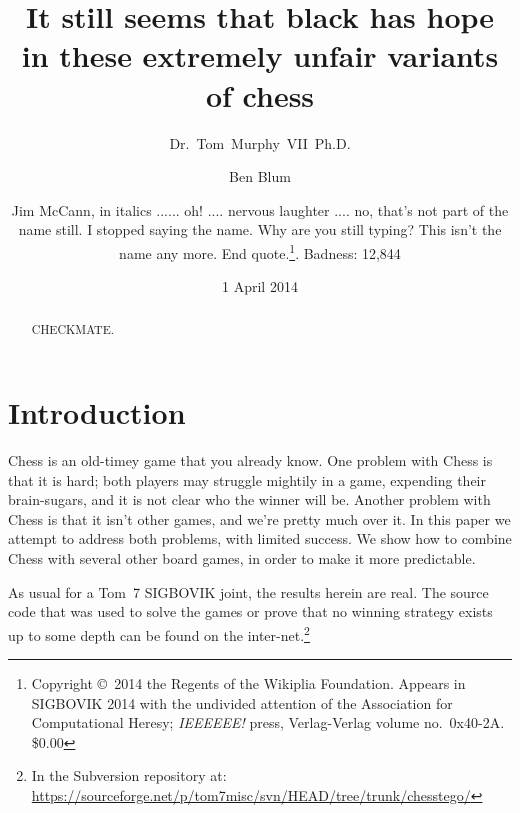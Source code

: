 \documentclass[twocolumn]{article}
\begin{document}
 

\title{It still seems that black has hope in these extremely unfair variants of chess}
\author{Dr.~Tom~Murphy~VII~Ph.D. \and Ben Blum \and
Jim McCann, in italics ...... oh! .... nervous laughter .... no, that's not part of the name still. I stopped saying the name. Why are you still typing? This isn't the name any more. End quote.\thanks{
Copyright \copyright\ 2014 the Regents of the Wikiplia
Foundation. Appears in SIGBOVIK 2014 with the undivided
attention of the Association for Computational Heresy; 
{\em IEEEEEE!} press, Verlag-Verlag volume no.~0x40-2A.
\$0.00}. Badness: 12,844 }


\newcommand\checkmate{\hspace{-.05em}\raisebox{.4ex}{\tiny\bf ++}}

\renewcommand\th{\ensuremath{{}^{\textrm{th}}}}
\newcommand\st{\ensuremath{{}^{\textrm{st}}}}
\newcommand\rd{\ensuremath{{}^{\textrm{rd}}}}
\newcommand\nd{\ensuremath{{}^{\textrm{nd}}}}
\newcommand\at{\ensuremath{\scriptstyle @}}

\date{1 April 2014}

\maketitle \thispagestyle{empty}

\begin{abstract}
CHECKMATE.
\end{abstract}

\section*{Introduction}

Chess is an old-timey game that you already know. One problem with
Chess is that it is hard; both players may struggle mightily in a
game, expending their brain-sugars, and it is not clear who the winner
will be. Another problem with Chess is that it isn't other games, and
we're pretty much over it. In this paper we attempt to address both
problems, with limited success. We show how to combine Chess with
several other board games, in order to make it more predictable.

As usual for a Tom~7 SIGBOVIK joint, the results herein are real.
The source code that was used to solve the games or prove that no
winning strategy exists up to some depth can be found on the inter-net.\!\footnote{In the Subversion repository at:
  \url{https://sourceforge.net/p/tom7misc/svn/HEAD/tree/trunk/chesstego/}}
\end{document}
